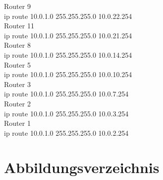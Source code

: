 \documentclass[a4paper]{article}
\begin{document}
Router 9\\
ip route 10.0.1.0 255.255.255.0 10.0.22.254 \\
Router 11\\
ip route 10.0.1.0 255.255.255.0 10.0.21.254 \\
Router 8\\
ip route 10.0.1.0 255.255.255.0 10.0.14.254 \\
Router 5\\
ip route 10.0.1.0 255.255.255.0 10.0.10.254 \\
Router 3\\
ip route 10.0.1.0 255.255.255.0 10.0.7.254 \\
Router 2\\
ip route 10.0.1.0 255.255.255.0 10.0.3.254 \\
Router 1\\
ip route 10.0.1.0 255.255.255.0 10.0.2.254 \\



\newpage

\section{Abbildungsverzeichnis}

\listoffigures
\end{document}
